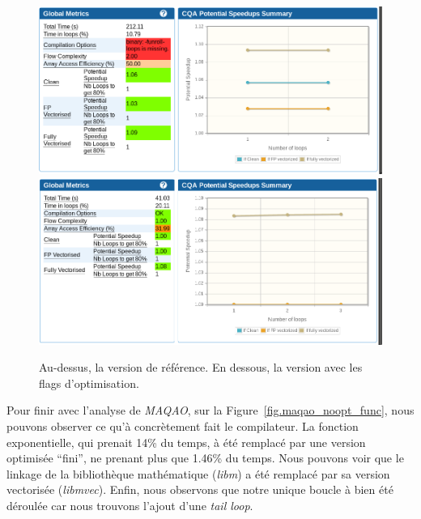 \documentclass[12pt,a4paper]{article}
\begin{document}
\begin{figure}[h]
    \centering
    \includegraphics[scale=0.5]{./figures/L1/maqao_noopt_ref_global.png}
    \includegraphics[scale=0.5]{./figures/L1/maqao_noopt_opt_global.png}
    \caption{Au-dessus, la version de référence. En dessous, la version avec les
    flags d'optimisation.}
    \label{fig.maqao_noopt_global}
\end{figure}

Pour finir avec l'analyse de \textit{MAQAO}, sur la
Figure~\ref{fig.maqao_noopt_func}, nous pouvons observer ce qu'à concrètement
fait le compilateur. La fonction exponentielle, qui prenait 14\% du temps, à été
remplacé par une version optimisée \enquote{fini}, ne prenant plus que 1.46\% du
temps. Nous pouvons voir que le linkage de la bibliothèque mathématique
(\textit{libm}) a été remplacé par sa version vectorisée (\textit{libmvec}).
Enfin, nous observons que notre unique boucle à bien été déroulée car nous
trouvons l'ajout d'une \textit{tail loop}.
\end{document}
